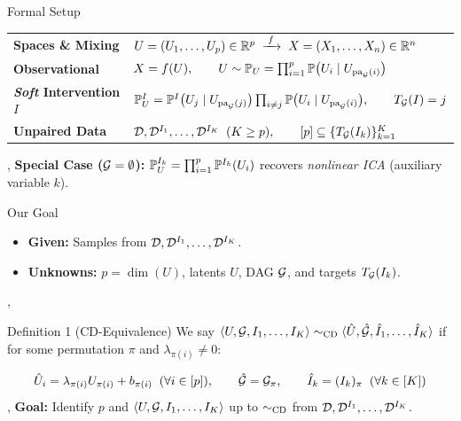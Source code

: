 
\begin{frame}{Formal Setup}
  \vspace{2ex}
  \renewcommand{\arraystretch}{2.1}
  \begin{tabular}{@{}p{3.1cm}l@{}}
    \textbf{Spaces \& Mixing} &
      $U = (U_1,\dots,U_p) \in \mathbb{R}^p \;\xrightarrow{\;f\;}\; X = (X_1,\dots,X_n) \in \mathbb{R}^n$ \\
    \textbf{Observational} &
      $X = f(U), \qquad U \sim \mathbb{P}_U = \prod_{i=1}^p \mathbb{P}\big(U_i \mid U_{\operatorname{pa}_{\mathcal{G}}(i)}\big)$ \\
    \textbf{\emph{Soft} Intervention $I$} &
      $\mathbb{P}_U^I = \mathbb{P}^I\big(U_j \mid U_{\operatorname{pa}_{\mathcal{G}}(j)}\big) \prod_{i \neq j} \mathbb{P}\big(U_i \mid U_{\operatorname{pa}_{\mathcal{G}}(i)}\big), \qquad T_{\mathcal{G}}(I) = j$ \\
    \textbf{Unpaired Data} &
      $\mathcal{D}, \mathcal{D}^{I_1},\dots,\mathcal{D}^{I_K} \;\; (K \geq p), \qquad [p] \subseteq \{T_{\mathcal{G}}(I_k)\}_{k=1}^K$
  \end{tabular}
  \sep
  \textbf{Special Case ($\mathcal{G} = \emptyset$):} \;
  $\mathbb{P}_U^{I_k} = \prod_{i=1}^p \mathbb{P}^{I_k}(U_i)$ \; recovers \emph{nonlinear ICA} (auxiliary variable $k$).
\end{frame}

\begin{frame}{Our Goal}
  \vspace{2ex}
  \begin{itemize}
    \item \textbf{Given:} Samples from $\mathcal{D}, \mathcal{D}^{I_1},\dots,\mathcal{D}^{I_K}$.
    \item \textbf{Unknowns:} $p = \dim(U)$, latents $U$, DAG $\mathcal{G}$, and targets $T_{\mathcal{G}}(I_k)$.
  \end{itemize}
  \sep
  \begin{statement}{Definition 1 (CD-Equivalence)}
    We say $\langle U,\mathcal{G},I_1,\dots,I_K\rangle \sim_{\mathrm{CD}} \langle \hat{U},\hat{\mathcal{G}},\hat{I}_1,\dots,\hat{I}_K\rangle$ if for some permutation $\pi$ and $\lambda_{\pi(i)} \neq 0$:
  \end{statement}
  \[
    \hat{U}_i = \lambda_{\pi(i)} U_{\pi(i)} + b_{\pi(i)} \;\; (\forall i \in [p]), \qquad
    \hat{\mathcal{G}} = \mathcal{G}_\pi, \qquad
    \hat{I}_k = (I_k)_\pi \;\; (\forall k \in [K])
  \]
  \sep
  \centering
  \textbf{Goal:} Identify $p$ and $\langle U,\mathcal{G},I_1,\dots,I_K\rangle$ up to $\sim_{\mathrm{CD}}$ from $\mathcal{D}, \mathcal{D}^{I_1},\dots,\mathcal{D}^{I_K}$.
\end{frame}

